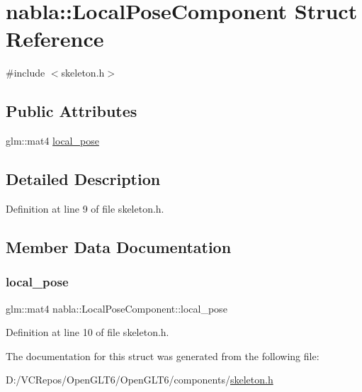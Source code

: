\hypertarget{structnabla_1_1_local_pose_component}{}\section{nabla\+::Local\+Pose\+Component Struct Reference}
\label{structnabla_1_1_local_pose_component}


{\ttfamily \#include $<$skeleton.\+h$>$}

\subsection*{Public Attributes}
\begin{DoxyCompactItemize}
\item 
glm\+::mat4 \mbox{\hyperlink{structnabla_1_1_local_pose_component_a82c2042902746a411f3d0f05fcfe2ef1}{local\+\_\+pose}}
\end{DoxyCompactItemize}


\subsection{Detailed Description}


Definition at line 9 of file skeleton.\+h.



\subsection{Member Data Documentation}
\mbox{\label{structnabla_1_1_local_pose_component_a82c2042902746a411f3d0f05fcfe2ef1}} 
\subsubsection{\texorpdfstring{local\_pose}{local\_pose}}
{\footnotesize\ttfamily glm\+::mat4 nabla\+::\+Local\+Pose\+Component\+::local\+\_\+pose}



Definition at line 10 of file skeleton.\+h.



The documentation for this struct was generated from the following file\+:\begin{DoxyCompactItemize}
\item 
D\+:/\+V\+C\+Repos/\+Open\+G\+L\+T6/\+Open\+G\+L\+T6/components/\mbox{\hyperlink{skeleton_8h}{skeleton.\+h}}\end{DoxyCompactItemize}
